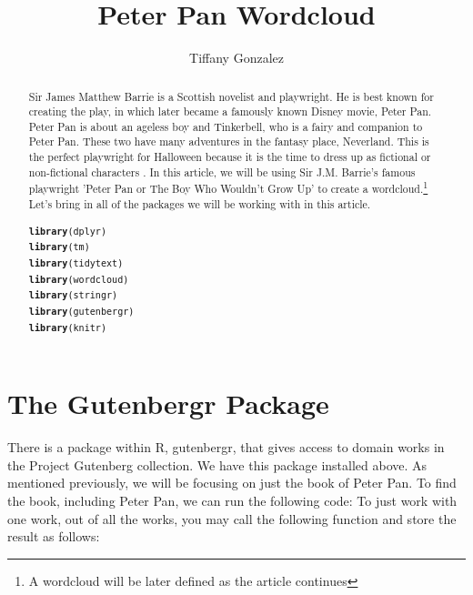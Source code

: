 \documentclass{article}\usepackage[]{graphicx}\usepackage[]{color}
\makeatletter
\newcommand{\hlstd}[1]{\textcolor[rgb]{0.345,0.345,0.345}{#1}}%
\newcommand{\hlkwd}[1]{\textcolor[rgb]{0.737,0.353,0.396}{\textbf{#1}}}%
\newenvironment{kframe}{%
 \def\at@end@of@kframe{}%
 \ifinner\ifhmode%
  \def\at@end@of@kframe{\end{minipage}}%
  \begin{minipage}{\columnwidth}%
 \fi\fi%
 \def\FrameCommand##1{\hskip\@totalleftmargin \hskip-\fboxsep
 \colorbox{shadecolor}{##1}\hskip-\fboxsep
     \hskip-\linewidth \hskip-\@totalleftmargin \hskip\columnwidth}%
 \MakeFramed {\advance\hsize-\width
   \@totalleftmargin\z@ \linewidth\hsize
   \@setminipage}}%
 {\par\unskip\endMakeFramed%
 \at@end@of@kframe}
\newenvironment{knitrout}{}{} %
\makeatother
\begin{document}
\title{Peter Pan Wordcloud}
\author{Tiffany Gonzalez}
\maketitle

\begin{abstract}
Sir James Matthew Barrie is a Scottish novelist and playwright. He is best known for creating the play, in which later became a famously known Disney movie, Peter Pan. Peter Pan is about an ageless boy and Tinkerbell, who is a fairy and companion to Peter Pan. These two have many adventures in the fantasy place, Neverland. This is the perfect playwright for Halloween because it is the time to dress up as fictional or non-fictional characters \citep{Barrie}. In this article, we will be using Sir J.M. Barrie's famous playwright 'Peter Pan or The Boy Who Wouldn't Grow Up' to create a wordcloud.\footnote{A wordcloud will be later defined as the article continues} Let's bring in all of the packages we will be working with in this article.

\begin{knitrout}
\color{fgcolor}\begin{kframe}
\begin{alltt}
\hlkwd{library}\hlstd{(dplyr)}
\hlkwd{library}\hlstd{(tm)}
\hlkwd{library}\hlstd{(tidytext)}
\hlkwd{library}\hlstd{(wordcloud)}
\hlkwd{library}\hlstd{(stringr)}
\hlkwd{library}\hlstd{(gutenbergr)}
\hlkwd{library}\hlstd{(knitr)}
\end{alltt}
\end{kframe}
\end{knitrout}


\end{abstract}

\section{The Gutenbergr Package}
There is a package within R, gutenbergr, that gives access to domain works in the Project Gutenberg collection. We have this package installed above. As mentioned previously, we will be focusing on just the book of Peter Pan. To find the book, including Peter Pan, we can run the following code:  To just work with one work, out of all the works, you may call the following function and store the result as follows:
\end{document}
